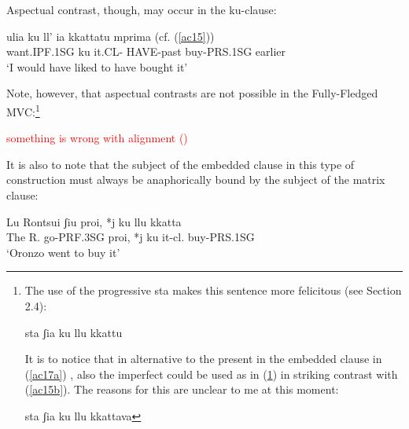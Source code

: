 \documentclass[output=paper]{langscibook}
\newcounter{lasttmp}    %
\newcommand{\Last}{\setcounter{lasttmp}{\value{equation}}(\thelasttmp)\xspace}
\begin{document}
\ea \label{ac15}
    \z
\z
     
Aspectual contrast, though, may occur in the ku-clause:

\ea \label{ac16}\gll ulia         ku  ll’   ia    kkattatu     mprima  (cf. (\ref{ac15}))\\
  want.IPF.1SG ku  it.CL- HAVE-past buy-PRS.1SG earlier\\
 \glt ‘I would have liked to have bought it’
\z

Note, however, that aspectual contrasts are not possible in the Fully-Fledged MVC:\footnote{The use of the progressive sta makes this sentence more felicitous (see Section 2.4):

\ea \label{fn7ex} {sta ʃia ku llu kkattu}
\z

It is to notice that in alternative to the present in the embedded clause in (\ref{ac17a}) , also the imperfect could be used as in (\ref{fn7ex2}) in striking contrast with (\ref{ac15b}). The reasons for this are unclear to me at this moment:

\ea \label{fn7ex2}{sta ʃia ku llu kkattava}
\z}

\ea\label{ac17}
    \z
\z 

\textcolor{red}{something is wrong with alignment \Last}

It is also to note that the subject of the embedded clause in this type of construction must always be anaphorically bound by the subject of the matrix clause:

\ea \label{ac18}\gll Lu Rontsui   ʃiu        proi, *j  ku  llu    kkatta\\
  The R.     go-PRF.3SG  proi, *j  ku  it-cl.  buy-PRS.1SG  \\
  \glt ‘Oronzo went to buy it’
\z
\end{document}
